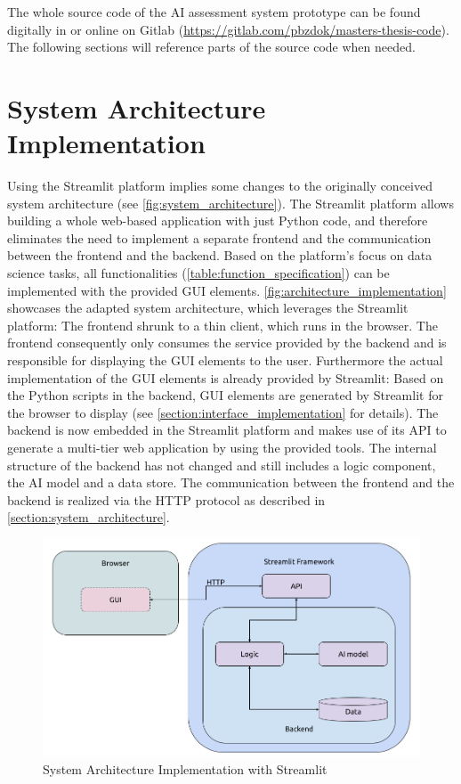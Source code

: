 \documentclass[11pt,a4paper,english]{scrreprt}
\begin{document}
The whole source code of the AI assessment system prototype can be found digitally in  or online on Gitlab (\url{https://gitlab.com/pbzdok/masters-thesis-code}). The following sections will reference parts of the source code when needed.

\section{System Architecture Implementation}
Using the Streamlit platform implies some changes to the originally conceived system architecture (see \autoref{fig:system_architecture}). The Streamlit platform allows building a whole web-based application with just Python code, and therefore eliminates the need to implement a separate frontend and the communication between the frontend and the backend. Based on the platform's focus on data science tasks, all functionalities (\autoref{table:function_specification}) can be implemented with the provided GUI elements. \autoref{fig:architecture_implementation} showcases the adapted system architecture, which leverages the Streamlit platform: The frontend shrunk to a thin client, which runs in the browser. The frontend consequently only consumes the service provided by the backend and is responsible for displaying the GUI elements to the user. Furthermore the actual implementation of the GUI elements is already provided by Streamlit: Based on the Python scripts in the backend, GUI elements are generated by Streamlit for the browser to display (see \autoref{section:interface_implementation} for details). The backend is now embedded in the Streamlit platform and makes use of its API to generate a multi-tier web application by using the provided tools. The internal structure of the backend has not changed and still includes a logic component, the AI model and a data store. The communication between the frontend and the backend is realized via the HTTP protocol as described in \autoref{section:system_architecture}.

\begin{figure}[htbp]
    \centering
    \includegraphics[width=\textwidth]{img/figures/architecture_implementation.png}
    \caption{System Architecture Implementation with Streamlit}
    \label{fig:architecture_implementation}
\end{figure}
\end{document}
